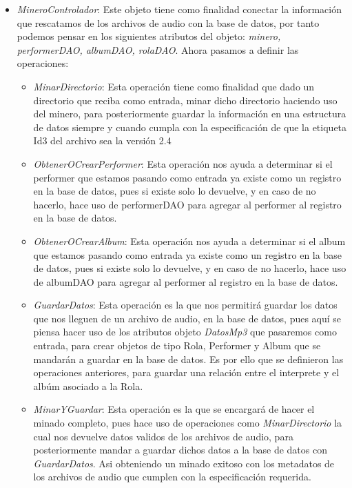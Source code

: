 \documentclass[10pt,letterpaper]{report}
\begin{document}
\begin{itemize}
    \item [-] \textit{MineroControlador}: Este objeto tiene como finalidad conectar la información que rescatamos de los archivos de audio con la base de datos, por tanto podemos pensar en los siguientes atributos del objeto: \textit{minero, performerDAO, albumDAO, rolaDAO}. Ahora pasamos a definir las operaciones:

    \begin{itemize}
        \item [-] \textit{MinarDirectorio}: Esta operación tiene como finalidad que dado un directorio que reciba como entrada, minar dicho directorio haciendo uso del minero, para posteriormente guardar la información en una estructura de datos siempre y cuando cumpla con la especificación de que la etiqueta Id3 del archivo sea la versión 2.4
        \item [-] \textit{ObtenerOCrearPerformer}: Esta operación nos ayuda a determinar si el performer que estamos pasando como entrada ya existe como un registro en la base de datos, pues si existe solo lo devuelve, y en caso de no hacerlo, hace uso de performerDAO para agregar al performer al registro en la base de datos. 
        
        \item [-] \textit{ObtenerOCrearAlbum}: Esta operación nos ayuda a determinar si el album que estamos pasando como entrada ya existe como un registro en la base de datos, pues si existe solo lo devuelve, y en caso de no hacerlo, hace uso de albumDAO para agregar al performer al registro en la base de datos. 

        \item [-] \textit{GuardarDatos}: Esta operación es la que nos permitirá guardar los datos que nos lleguen de un archivo de audio, en la base de datos, pues aquí se piensa hacer uso de los atributos objeto \textit{DatosMp3} que pasaremos como entrada, para crear objetos de tipo Rola, Performer y Album que se mandarán a guardar en la base de datos. Es por ello que se definieron las operaciones anteriores, para guardar una relación entre el interprete y el albúm asociado a la Rola.  

        \item [-] \textit{MinarYGuardar}: Esta operación es la que se encargará de hacer el minado completo, pues hace uso de operaciones como \textit{MinarDirectorio} la cual nos devuelve datos validos de los archivos de audio, para posteriormente mandar a guardar dichos datos a la base de datos con \textit{GuardarDatos}. Asi obteniendo un minado exitoso con los metadatos de los archivos de audio que cumplen con la especificación requerida.
    \end{itemize}
\end{itemize}
\end{document}
